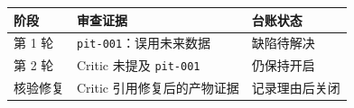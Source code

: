 \begin{tabular}{@{}P{3.0cm}P{4.6cm}P{4.9cm}@{}}
\toprule
\textbf{阶段} & \textbf{审查证据} & \textbf{台账状态} \\
\midrule
第 1 轮 & \texttt{pit-001}：误用未来数据 & 缺陷待解决 \\
第 2 轮 & Critic 未提及 \texttt{pit-001} & 仍保持开启 \\
核验修复 & Critic 引用修复后的产物证据 & 记录理由后关闭 \\
\bottomrule
\end{tabular}
